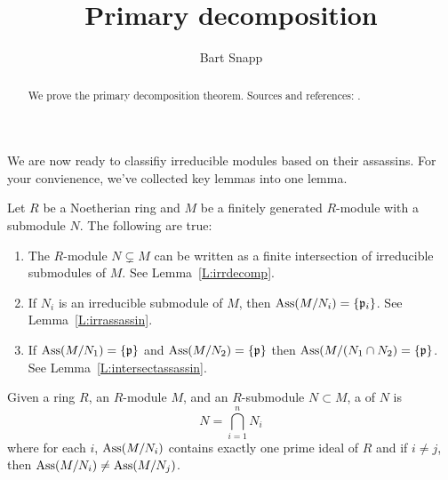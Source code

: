 \documentclass{ximera}
\author{Bart Snapp}
\title{Primary decomposition}
\begin{document}
\begin{abstract}
  We prove the primary decomposition theorem. Sources and references:
  \cite{sD2008,jpS2000}.
\end{abstract}
\maketitle

We are now ready to classifiy irreducible modules based on their
assassins. For your convienence, we've collected key lemmas into one lemma.

\begin{lemma}\label{L:biglempd}
  Let $R$ be a Noetherian ring and $M$ be a finitely generated
  $R$-module with a submodule $N$. The following are true:
  \begin{enumerate}
    \item The $R$-module $N\subsetneq M$ can be written as a finite
      intersection of irreducible submodules of $M$. See Lemma~\ref{L:irrdecomp}.
    \item If $N_i$ is an irreducible submodule of $M$, then
      $\operatorname{Ass}(M/N_i)=\{\mathfrak{p}_i\}$. See Lemma~\ref{L:irrassassin}.
    \item If $\operatorname{Ass}(M/N_1) = \{\mathfrak{p}\}$ and $\operatorname{Ass}(M/N_2) = \{\mathfrak{p}\}$ then
      $\operatorname{Ass}(M/(N_1\cap N_2) = \{\mathfrak{p}\}$. See
      Lemma~\ref{L:intersectassassin}.
  \end{enumerate}
\end{lemma}





\begin{definition}
  Given a ring $R$, an $R$-module $M$, and an $R$-submodule $N\subset
  M$, a  of $N$ is
  \[
  N = \bigcap_{i=1}^n N_i
  \]
  where for each $i$, $\operatorname{Ass}(M/N_i)$ contains exactly one prime ideal
  of $R$ and if $i\ne j$, then $\operatorname{Ass}(M/N_i) \ne \operatorname{Ass}(M/N_j)$.
\end{definition}
\end{document}
